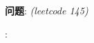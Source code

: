     
\begin{description}
    \item{\textbf{问题}}: 
\textit{(leetcode 145)}
    \item{\textbf{}} : 
    \\
    \begin{lstlisting}
    \end{lstlisting}
    \textit{}
\end{description}
